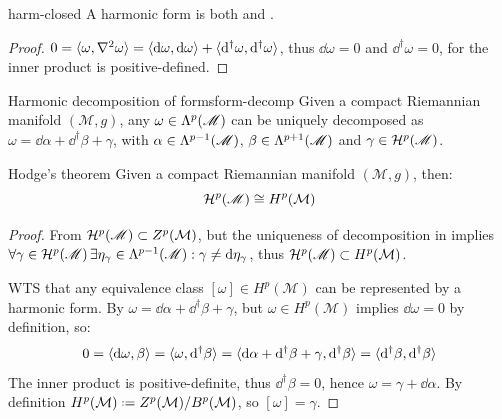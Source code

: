 \begin{proposition}{}{harm-closed}
  A harmonic form is both  and .
\end{proposition}

\begin{proofbox}
  \begin{proof}
    $ 0 = \braket{\omega, \nabla^2 \omega} = \braket{\mathrm{d}\omega, \mathrm{d}\omega} + \braket{\mathrm{d}^{\dagger} \omega, \mathrm{d}^{\dagger}{\omega}} $, thus $ \dd\omega = 0 $ and $ \dd^{\dagger} \omega = 0 $, for the inner product is positive-defined.
  \end{proof}
\end{proofbox}

\begin{theorem}{Harmonic decomposition of forms}{form-decomp}
  Given a compact Riemannian manifold $ (\mathcal{M},g) $, any $ \omega \in \Lambda^{p}(\mathscr{M}) $ can be uniquely decomposed as $ \omega = \dd \alpha + \dd^{\dagger}\beta + \gamma $, with $ \alpha \in \Lambda^{p-1}(\mathscr{M}) $, $ \beta \in \Lambda^{p+1}(\mathscr{M}) $ and $ \gamma \in \mathcal{H}^{p}(\mathscr{M}) $.
\end{theorem}

\begin{theorem}{Hodge's theorem}{}
  Given a compact Riemannian manifold $ (\mathcal{M},g) $, then:
  \begin{equation}
    \mathcal{H}^{p}(\mathscr{M}) \cong H^p(\mathcal{M})
  \end{equation}
\end{theorem}

\begin{proofbox}
  \begin{proof}
    From  $ \mathcal{H}^{p}(\mathscr{M}) \subset Z^p(\mathcal{M}) $, but the uniqueness of decomposition in  implies $ \forall \gamma \in \mathcal{H}^{p}(\mathscr{M}) \,\exists \eta_{\gamma} \in \Lambda^{p-1}(\mathscr{M}) : \gamma \neq \mathrm{d}\eta_{\gamma} $, thus $ \mathcal{H}^{p}(\mathscr{M}) \subset H^p(\mathcal{M}) $.

    WTS that any equivalence class $ [\omega] \in H^p(\mathcal{M}) $ can be represented by a harmonic form. By  $ \omega = \dd\alpha + \dd^{\dagger}\beta + \gamma $, but $ \omega \in H^p(\mathcal{M}) $ implies $ \dd\omega = 0 $ by definition, so:
    \begin{equation*}
      0 = \braket{\mathrm{d}\omega, \beta} = \braket{\omega, \mathrm{d}^{\dagger} \beta} = \braket{\mathrm{d}\alpha + \mathrm{d}^{\dagger}\beta + \gamma, \mathrm{d}^{\dagger}\beta} = \braket{\mathrm{d}^{\dagger} \beta, \mathrm{d}^{\dagger} \beta}
    \end{equation*}
    The inner product is positive-definite, thus $ \dd^{\dagger} \beta = 0 $, hence $ \omega = \gamma + \dd\alpha $. By definition $ H^p(\mathcal{M}) \defeq Z^p(\mathcal{M}) / B^p(\mathcal{M}) $, so $ [\omega] = \gamma $.
  \end{proof}
\end{proofbox}

